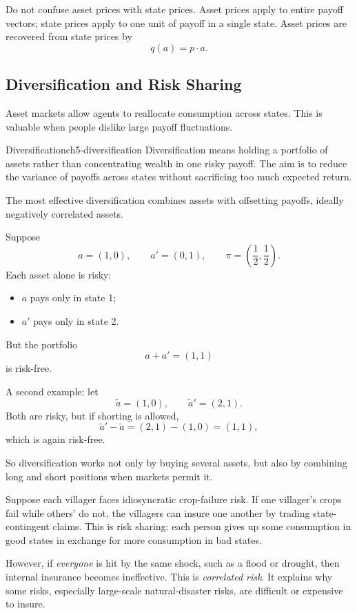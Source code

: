 \begin{commonmistake}
Do not confuse asset prices with state prices. Asset prices apply to entire payoff vectors; state prices apply to one unit of payoff in a single state. Asset prices are recovered from state prices by
\[
q(a)=p\cdot a.
\]
\end{commonmistake}

\subsection{Diversification and Risk Sharing}

Asset markets allow agents to reallocate consumption across states. This is valuable when people dislike large payoff fluctuations.

\begin{definition}{Diversification}{ch5-diversification}
Diversification means holding a portfolio of assets rather than concentrating wealth in one risky payoff. The aim is to reduce the variance of payoffs across states without sacrificing too much expected return.
\end{definition}

The most effective diversification combines assets with offsetting payoffs, ideally negatively correlated assets.

\begin{examplebox}[title={Worked Example: diversification can create a safe payoff}]
Suppose
\[
a=(1,0),
\qquad
a'=(0,1),
\qquad
\pi=\left(\frac12,\frac12\right).
\]
Each asset alone is risky:
\begin{itemize}
    \item $a$ pays only in state 1;
    \item $a'$ pays only in state 2.
\end{itemize}
But the portfolio
\[
a+a'=(1,1)
\]
is risk-free.

A second example: let
\[
\tilde a=(1,0),
\qquad
\tilde a'=(2,1).
\]
Both are risky, but if shorting is allowed,
\[
\tilde a' - \tilde a = (2,1)-(1,0)=(1,1),
\]
which is again risk-free.

So diversification works not only by buying several assets, but also by combining long and short positions when markets permit it.
\end{examplebox}

\begin{policynote}[title={Policy Application: village risk sharing}]
Suppose each villager faces idiosyncratic crop-failure risk. If one villager's crops fail while others' do not, the villagers can insure one another by trading state-contingent claims. This is risk sharing: each person gives up some consumption in good states in exchange for more consumption in bad states.

However, if \emph{everyone} is hit by the same shock, such as a flood or drought, then internal insurance becomes ineffective. This is \emph{correlated risk}. It explains why some risks, especially large-scale natural-disaster risks, are difficult or expensive to insure.
\end{policynote}

